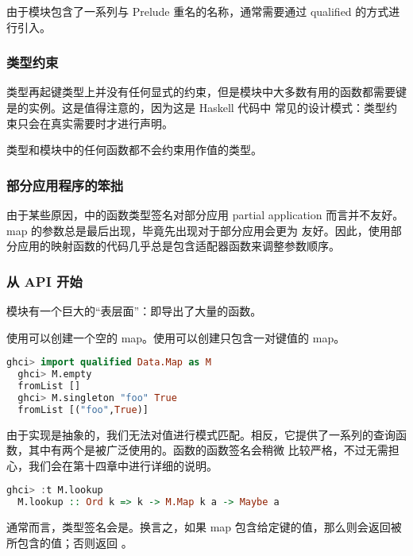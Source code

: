 \documentclass[./main.tex]{subfiles}
\begin{document}
由于模块包含了一系列与 Prelude 重名的名称，通常需要通过 qualified 的方式进行引入。

\subsubsection*{类型约束}

类型再起键类型上并没有任何显式的约束，但是模块中大多数有用的函数都需要键是的实例。这是值得注意的，因为这是 Haskell 代码中
常见的设计模式：类型约束只会在真实需要时才进行声明。

类型和模块中的任何函数都不会约束用作值的类型。

\subsubsection*{部分应用程序的笨拙}

由于某些原因，中的函数类型签名对部分应用 partial application 而言并不友好。map 的参数总是最后出现，毕竟先出现对于部分应用会更为
友好。因此，使用部分应用的映射函数的代码几乎总是包含适配器函数来调整参数顺序。

\subsubsection*{从 API 开始}

模块有一个巨大的“表层面”：即导出了大量的函数。

使用可以创建一个空的 map。使用可以创建只包含一对键值的 map。

\begin{lstlisting}[language=Haskell]
  ghci> import qualified Data.Map as M
  ghci> M.empty
  fromList []
  ghci> M.singleton "foo" True
  fromList [("foo",True)]
\end{lstlisting}

由于实现是抽象的，我们无法对值进行模式匹配。相反，它提供了一系列的查询函数，其中有两个是被广泛使用的。函数的函数签名会稍微
比较严格，不过无需担心，我们会在第十四章中进行详细的说明。

\begin{lstlisting}[language=Haskell]
  ghci> :t M.lookup
  M.lookup :: Ord k => k -> M.Map k a -> Maybe a
\end{lstlisting}

通常而言，类型签名会是。换言之，如果 map 包含给定键的值，那么则会返回被所包含的值；否则返回
。
\end{document}
